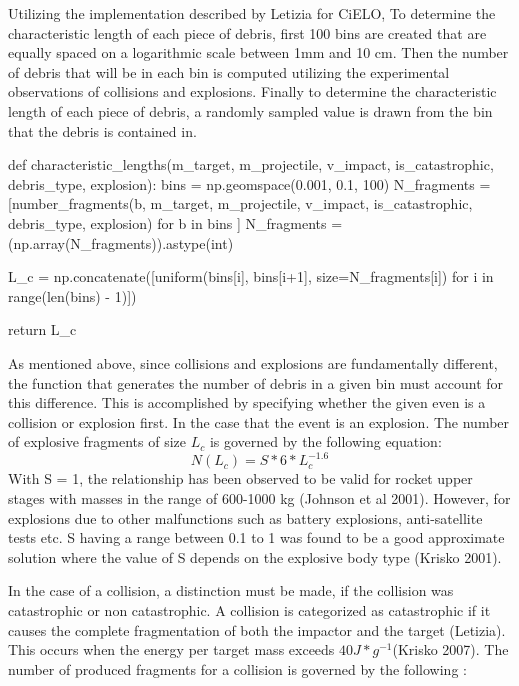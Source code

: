 \documentclass{article}
\newenvironment{code}{\captionsetup{type=listing}}{}
\begin{document}
Utilizing the implementation described by Letizia for CiELO, To determine the characteristic length of each piece of debris, first 100 bins are created that are equally spaced on a logarithmic scale between 1mm and 10 cm. Then the number of debris that will be in each bin is computed utilizing the experimental observations of collisions and explosions. Finally to determine the characteristic length of each piece of debris, a randomly sampled value is drawn from the bin that the debris is contained in.
 
\newpage

 \begin{code}
 	\begin{tcbpythoncode}
 		def characteristic_lengths(m_target, m_projectile, v_impact, is_catastrophic, debris_type, explosion):
 		bins = np.geomspace(0.001, 0.1, 100)
 		N_fragments = [number_fragments(b, m_target, m_projectile, v_impact, is_catastrophic, debris_type, explosion) for b in bins ]
 		N_fragments = (np.array(N_fragments)).astype(int)
 		
 		L_c = np.concatenate([uniform(bins[i], bins[i+1], size=N_fragments[i]) for i in range(len(bins) - 1)])
 		
 		return L_c
 	\end{tcbpythoncode}
 \end{code}
 
 
 
As mentioned above, since collisions and explosions are fundamentally different, the function that generates the number of debris in a given bin must account for this difference. This is accomplished by specifying whether the given even is a collision or explosion first. In the case that the event is an explosion. The number of explosive fragments of size $L_c$ is governed by the following equation:
$$N(L_c) =S * 6 * L_c^{-1.6}$$
With S = 1, the relationship has been observed to be valid for rocket upper stages with masses in the range of 600-1000 kg (Johnson et al 2001). However, for explosions due to other malfunctions such as battery explosions, anti-satellite tests etc. S having a range between 0.1 to 1 was found to be a good approximate solution where the value of S depends on the explosive body type (Krisko 2001). 

In the case of a collision, a distinction must be made, if the collision was catastrophic or non catastrophic. A collision is categorized as catastrophic if it causes the complete fragmentation of both the impactor and the target (Letizia). This occurs when the energy per target mass exceeds $40 J * g^{-1}$(Krisko 2007). The number of produced fragments for a collision is governed by the following :
\end{document}

